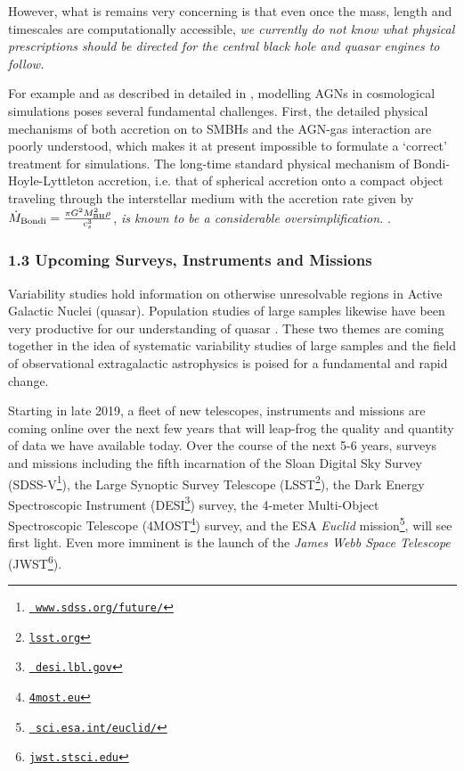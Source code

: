 \smallskip
\smallskip
\noindent
However, what is remains very concerning is that even once the 
mass, length and timescales are computationally accessible, {\it we 
currently do not know what physical prescriptions should be 
directed for the central black hole and quasar engines to follow.}


\smallskip
\smallskip
\noindent
For example and as described in detailed in \citet{Weinberger2017},
modelling AGNs in cosmological simulations poses several fundamental
challenges. First, the detailed physical mechanisms of both accretion
on to SMBHs \citep{Hopkins_Quataert2010, Hopkins_Quataert2011,
Angles-Alcazar2013, Gaspari2013, Angles-Alcazar2015,
Angles-Alcazar2017, CurtisSijacki2015, CurtisSijacki2016a,
CurtisSijacki2016b, Emsellem2015, Rosas-Guevara2015} and the AGN-gas
interaction \citep{Huarte-Espinosa2011, Gaibler2012, Cielo2014,
Costa2014, Roos2015, Hopkins2016, Bieri2017} are poorly understood,
which makes it at present impossible to formulate a `correct'
treatment for simulations.  The long-time standard physical mechanism
of Bondi-Hoyle-Lyttleton accretion, i.e. that of spherical accretion
onto a compact object traveling through the interstellar medium
\citep{Hoyle_Lyttleton1939, Bondi_Hoyle1944, Bondi1952} with the
accretion rate given by $\dot {M}_{\rm Bondi} = \frac{\pi G^{2 }M_{\rm
BH}^{2} \rho }{c_{s}^{3}} $, {\it is known to be a considerable
oversimplification.} \citep[e.g.,][]{Edgar2004}.


\subsubsection*{1.3 Upcoming Surveys, Instruments and Missions}
\smallskip
\smallskip
\noindent
Variability studies hold information on otherwise unresolvable regions
in Active Galactic Nuclei (quasar). Population studies of large
samples likewise have been very productive for our understanding of
quasar \citep{Lawrence2016_ASPC}.  These two themes are coming
together in the idea of systematic variability studies of large
samples and the field of observational extragalactic astrophysics is
poised for a fundamental and rapid change.

\smallskip
\smallskip
\noindent
Starting in late 2019, a fleet of new telescopes, instruments and missions are coming 
online over the next few years that will leap-frog the quality and
quantity of data we have available today. Over the course of the next
5-6 years, surveys and missions including the fifth incarnation of the
Sloan Digital Sky Survey
(SDSS-V\footnote{\href{www.sdss.org/future/}{{\tt
www.sdss.org/future/}}}), the Large Synoptic Survey Telescope
(LSST\footnote{\href{lsst.org}{{\tt lsst.org}}}), the Dark Energy
Spectroscopic Instrument (DESI\footnote{\href{desi.lbl.gov}{{\tt
desi.lbl.gov}}}) survey, the 4-meter Multi-Object Spectroscopic
Telescope (4MOST\footnote{\href{4most.eu}{{\tt 4most.eu}}}) survey,
and the ESA {\it Euclid}
mission\footnote{\href{sci.esa.int/euclid/}{{\tt
sci.esa.int/euclid/}}}, will see first light. Even more imminent is
the launch of the {\it James Webb Space Telescope}
(JWST\footnote{\href{jwst.stsci.edu}{{\tt jwst.stsci.edu}}}).




